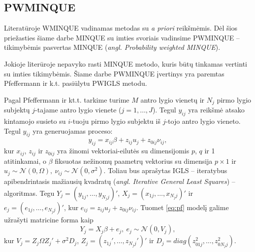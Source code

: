 \documentclass[12pt,a4paper]{article}
\begin{document}
\subsection{PWMINQUE}
\indent Literatūroje WMINQUE vadinamas metodas su \textit{a priori} reikšmėmis. Dėl šios priežasties šiame darbe MINQUE su imties svoriais vadinsime PWMINQUE -- tikimybėmis pasvertas MINQUE (\textit{angl. Probability weighted MINQUE}).

\indent Jokioje literūroje nepavyko rasti MINQUE metodo, kuris būtų tinkamas vertinti su imties tikimybėmis. Šiame darbe PWMINQUE įvertinys yra paremtas Pfeffermann ir k.t.\cite{pfeff} pasiūlytu PWIGLS metodu.

\indent Pagal Pfeffermann ir kt.t. tarkime turime $M$ antro lygio vienetų ir $N_j$ pirmo lygio subjektų $j$-tajame antro lygio vienete ($j=1,\dots,J$). Tegul $y_{ij}$ yra reikšmė atsako kintamojo susieto su $i$-tuoju pirmo lygio subjektu iš $j$-tojo antro lygio vieneto. Tegul $y_{ij}$ yra generuojamas proceso:
\begin{equation}\label{eq:pf}
y_{ij}=x_{ij}\beta+z_{ij}u_j+z_{0ij}\nu_{ij},
\end{equation} 
kur $x_{ij}$, $z_{ij}$ ir $z_{0ij}$ yra žinomi vektoriai-eilutės su dimensijomis $p$, $q$ ir 1 atitinkamai, o $\beta$ fiksuotas nežinomų paametrų vektorius su dimensija $p\times1$ ir $u_j\sim \mathcal{N}(0, \Omega),\ \nu_{ij}\sim \mathcal{N}(0, \sigma^2)$. Toliau bus aprašytas IGLS -- iteratybus apibendrintasis mažiausių kvadratų (\textit{angl. Iterative General Least Squares}) -- algoritmas. Tegu $Y_j = (y_{1j},\dots,y_{N_jj})'$, $X_j=(x_{1j},\dots,x_{N_jj})'$ ir $e_j=(e_{1j},\dots,e_{N_jj})'$, kur $e_{ij}=z_{ij}u_j+z_{0ij}\nu_{ij}$. Tuomet \ref{eq:pf} modelį galime užrašyti matricine forma kaip
\begin{equation}
Y_j=X_j\beta+e_j, \ e_j\sim \mathcal{N}(0, V_j),
\end{equation}
kur $V_j=Z_j\Omega Z_j'+\sigma^2D_j$, $Z_j=(z_{1j}',\dots,z_{N_jj}')'$ ir $D_j=diag(z_{01j}^2,\dots,z_{0N_jj}^2)$.
\end{document}
